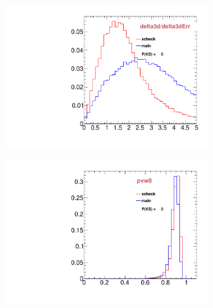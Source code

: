 \begin{figure}
\begin{subfigure}[b]{0.2\textwidth}
                \includegraphics[width=\textwidth]{Figures/VariablesComparison/Data_endcaps_figs/pvips}
                \label{fig:Data_endcaps_pvips}
        \end{subfigure}
        \begin{subfigure}[b]{0.2\textwidth}
                \centering
                \includegraphics[width=\textwidth]{Figures/VariablesComparison/Data_endcaps_figs/pvw8}
                \label{fig:Data_endcaps_pvw8}
        \end{subfigure}
        \begin{subfigure}[b]{0.2\textwidth}
                \centering

\end{subfigure}
\end{figure}
